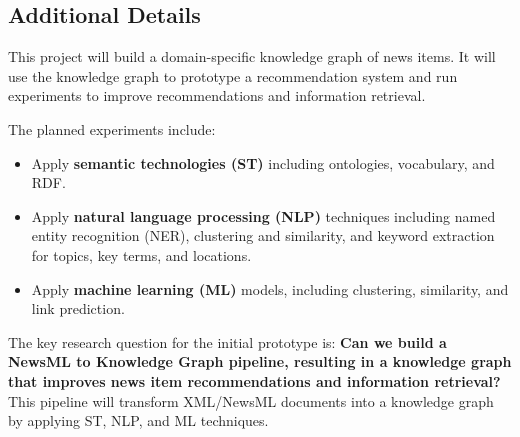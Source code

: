 \documentclass[11pt]{article}
\begin{document}
\subsection{Additional Details}

This project will build a domain-specific knowledge graph of news items. It will use the knowledge graph to prototype a recommendation system and run experiments to improve recommendations and information retrieval.

The planned experiments include:

\begin{itemize}
\item Apply \textbf{semantic technologies (ST)} including ontologies, vocabulary, and RDF.
\item Apply \textbf{natural language processing (NLP)} techniques including named entity recognition (NER), clustering and similarity, and keyword extraction for topics, key terms, and locations.
\item Apply \textbf{machine learning (ML)} models, including clustering, similarity, and link prediction.
\end{itemize}

The key research question for the initial prototype is: \textbf{Can we build a NewsML to Knowledge Graph pipeline, resulting in a knowledge graph that improves news item recommendations and information retrieval?} This pipeline will transform XML/NewsML documents into a knowledge graph by applying ST, NLP, and ML techniques.
\end{document}
